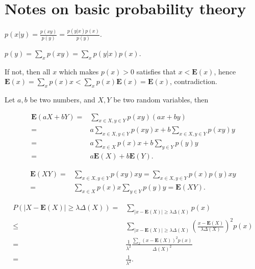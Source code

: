 \chapter{Notes on basic probability theory}

\ex $p(x|y) = \frac{p(xy)}{p(y)} = \frac{p(y|x)p(x)}{p(y)}$.

\ex $p(y) = \sum_x p(xy) = \sum_x p(y|x) p(x)$.

\ex If not, then all $x$ which makes $p(x)>0$ satisfies that $x<\bm{E}(x)$, hence $\bm{E}(x) = \sum_x p(x) x < \sum_x p(x) \bm{E}(x) = \bm{E}(x)$, contradiction.

\ex Let $a,b$ be two numbers, and $X,Y$ be two random variables, then

$$\begin{aligned}
    \bm{E}(aX+bY) = & \sum_{x\in X,y\in Y}p(xy)(ax+by)
    \\ = & a\sum_{x\in X,y\in Y}p(xy)x + b\sum_{x\in X,y\in Y}p(xy)y
    \\ = & a\sum_{x\in X}p(x)x + b\sum_{y\in Y}p(y)y
    \\ = & a\bm{E}(X) + b\bm{E}(Y).
\end{aligned}$$

\ex $$\begin{aligned}
    \bm{E}(XY) = & \sum_{x\in X,y\in Y}p(xy)xy
    = \sum_{x\in X,y\in Y}p(x)p(y)xy
    \\ = & \sum_{x\in X}p(x)x\sum_{y\in Y}p(y)y
    = \bm{E}(XY).
\end{aligned}$$

\ex $$\begin{aligned}
P(|X-\bm{E}(X)|\ge\lambda\Delta(X)) 
= & \sum_{|x-\bm{E}(X)|\ge\lambda\Delta(X)}p(x)
\\ \le & \sum_{|x-\bm{E}(X)|\ge\lambda\Delta(X)} \left(\frac{x-\bm{E}(X)}{\lambda\Delta(X)}\right)^2p(x)
\\ = & \frac{1}{\lambda^2} \frac{\sum_{x}(x-\bm{E}(X))^2p(x)}{\Delta(X)^2}
\\ = & \frac{1}{\lambda^2}.
\end{aligned}$$